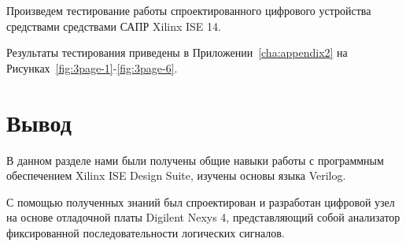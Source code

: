 Произведем тестирование работы спроектированного цифрового устройства средствами средствами САПР Xilinx ISE 14. 

Результаты тестирования приведены в Приложении~\ref{cha:appendix2} на Рисунках~\ref{fig:3page-1}-\ref{fig:3page-6}.



\section{Вывод}
В данном разделе нами были получены общие навыки работы с программным обеспечением Xilinx ISE Design Suite, изучены основы языка Verilog.

С помощью полученных знаний был спроектирован и разработан цифровой узел на основе отладочной платы Digilent Nexys 4, представляющий собой анализатор фиксированной последовательности логических
сигналов. 


